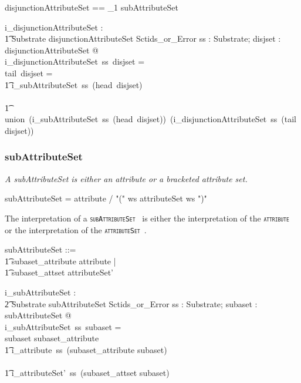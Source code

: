 \documentclass{article}
\def\spec#1{{\tt \small \textsc{{#1}} }}
\def\bnf#1{{\scriptsize {{#1}} }}
\def\desc#1{{\small \textsl{{#1}} }}
\begin{document}
\begin{zed}
disjunctionAttributeSet ==  \seq_1 subAttributeSet 
\end{zed}

\begin{gendef}
    i\_disjunctionAttributeSet : \\
\t1 Substrate \fun disjunctionAttributeSet \fun Sctids\_or\_Error
\where
   \forall ss : Substrate;  disjset : disjunctionAttributeSet @ \\
   i\_disjunctionAttributeSet~ss~disjset = ~ \\
   \IF tail~disjset = \langle \rangle \THEN \\
   \t1 i\_subAttributeSet~ss~(head~disjset) \\
\ELSE \\
\t1 union~(i\_subAttributeSet~ss~(head~disjset))~(i\_disjunctionAttributeSet~ss~(tail~disjset))
\end{gendef}

\subsubsection{subAttributeSet}
\begin{framed}
\desc{A subAttributeSet is either an attribute or a bracketed attribute set.}
\end{framed}
\begin{framed}
\noindent
\bnf{subAttributeSet = attribute / "(" ws attributeSet ws ")"}
\end{framed}

The interpretation of a \spec{subAttributeSet} is either the interpretation of the \spec{attribute} or the interpretation of the \spec{attributeSet}.

\begin{zed}
subAttributeSet ::= \\
\t1 subaset\_attribute \ldata attribute \rdata | \\
\t1 subaset\_attset \ldata attributeSet' \rdata
\end{zed}

\begin{gendef}
   i\_subAttributeSet : \\
\t2 Substrate \fun subAttributeSet \fun Sctids\_or\_Error
\where
   \forall ss : Substrate; subaset : subAttributeSet @ \\
   i\_subAttributeSet~ss~subaset = \\
   \IF subaset \in \ran subaset\_attribute \THEN \\
   \t1 i\_attribute~ss~(subaset\_attribute \inv subaset) \\
  \ELSE \\
  \t1 i\_attributeSet'~ss~(subaset\_attset \inv subaset)
\end{gendef}
\end{document}
